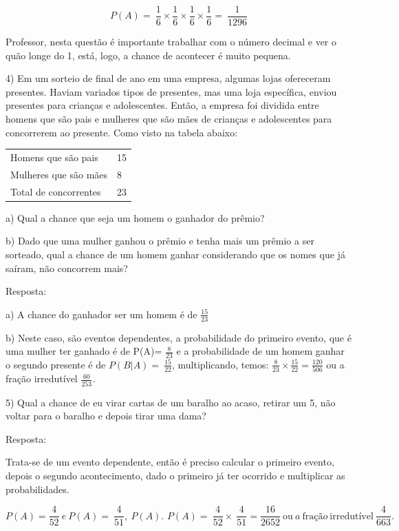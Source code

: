 {\[P(A) = \ \frac{1}{6} \times \frac{1}{6} \times \frac{1}{6} \times \frac{1}{6} = \ \frac{1}{1296}\]

Professor, nesta questão é importante trabalhar com o número decimal e
ver o quão longe do 1, está, logo, a chance de acontecer é muito
pequena.

4) Em um sorteio de final de ano em uma empresa, algumas lojas
ofereceram presentes. Haviam variados tipos de presentes, mas uma loja
específica, enviou presentes para crianças e adolescentes. Então, a
empresa foi dividida entre homens que são pais e mulheres que são mães
de crianças e adolescentes para concorrerem ao presente. Como visto na
tabela abaixo:

\begin{longtable}[]{@{}ll@{}}
\toprule
\endhead
Homens que são pais & 15\tabularnewline
Mulheres que são mães & 8\tabularnewline
Total de concorrentes & 23\tabularnewline
\bottomrule
\end{longtable}

a) Qual a chance que seja um homem o ganhador do prêmio?

b) Dado que uma mulher ganhou o prêmio e tenha mais um prêmio a ser
sorteado, qual a chance de um homem ganhar considerando que os nomes que
já saíram, não concorrem mais?

Resposta:

a) A chance do ganhador ser um homem é de \(\frac{15}{23}\)

b) Neste caso, são eventos dependentes, a probabilidade do primeiro
evento, que é uma mulher ter ganhado é de P(A)= \(\frac{8}{23}\) e a
probabilidade de um homem ganhar o segundo presente é de
\(P(B|A) = \ \frac{15}{22}\), multiplicando, temos:
\(\frac{8}{23} \times \frac{15}{22} = \frac{120}{506}\) ou a fração
irredutível \(\frac{60}{253}.\)

5) Qual a chance de eu virar cartas de um baralho ao acaso, retirar um
5, não voltar para o baralho e depois tirar uma dama?

Resposta:

Trata-se de um evento dependente, então é preciso calcular o primeiro
evento, depois o segundo acontecimento, dado o primeiro já ter ocorrido
e multiplicar as probabilidades.

\[P\left( A \right) = \frac{4}{52}\ e\ P\left( A \right) = \ \frac{4}{51},\ P\left( A \right)\text{.\ }P\left( A \right) = \ \frac{4}{52} \times \ \frac{4}{51} = \frac{16}{2652}\ \text{ou}\ a\ \text{fra}ção\ \text{irredut}í\text{vel}\ \frac{4}{663}.\]

}
